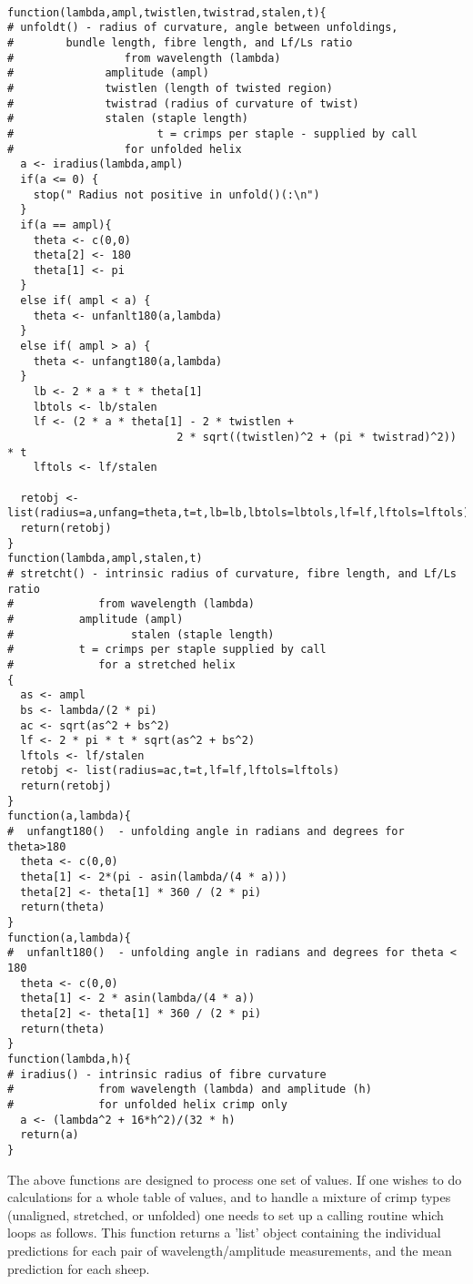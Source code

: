 \documentclass[titlepage,10pt]{article}  %
\begin{document}
\begin{verbatim}

function(lambda,ampl,twistlen,twistrad,stalen,t){
# unfoldt() - radius of curvature, angle between unfoldings,
#	     bundle length, fibre length, and Lf/Ls ratio
#                 from wavelength (lambda) 
#		       amplitude (ampl)
#		       twistlen (length of twisted region)
#		       twistrad (radius of curvature of twist)
#		       stalen (staple length)
#                      t = crimps per staple - supplied by call
#                 for unfolded helix
  a <- iradius(lambda,ampl)
  if(a <= 0) {
    stop(" Radius not positive in unfold()(:\n")
  }
  if(a == ampl){
    theta <- c(0,0)
    theta[2] <- 180
    theta[1] <- pi
  }
  else if( ampl < a) {
    theta <- unfanlt180(a,lambda)
  }
  else if( ampl > a) {
    theta <- unfangt180(a,lambda)
  }
    lb <- 2 * a * t * theta[1]
    lbtols <- lb/stalen
    lf <- (2 * a * theta[1] - 2 * twistlen +
                          2 * sqrt((twistlen)^2 + (pi * twistrad)^2)) * t
    lftols <- lf/stalen

  retobj <- list(radius=a,unfang=theta,t=t,lb=lb,lbtols=lbtols,lf=lf,lftols=lftols)
  return(retobj)
}
function(lambda,ampl,stalen,t)
# stretcht() - intrinsic radius of curvature, fibre length, and Lf/Ls ratio 
#             from wavelength (lambda) 
#		   amplitude (ampl)
#                  stalen (staple length)
#		   t = crimps per staple supplied by call
#             for a stretched helix
{
  as <- ampl
  bs <- lambda/(2 * pi)
  ac <- sqrt(as^2 + bs^2)
  lf <- 2 * pi * t * sqrt(as^2 + bs^2)
  lftols <- lf/stalen
  retobj <- list(radius=ac,t=t,lf=lf,lftols=lftols)
  return(retobj)
}
function(a,lambda){
#  unfangt180()  - unfolding angle in radians and degrees for theta>180
  theta <- c(0,0)
  theta[1] <- 2*(pi - asin(lambda/(4 * a)))
  theta[2] <- theta[1] * 360 / (2 * pi)
  return(theta)
}
function(a,lambda){
#  unfanlt180()  - unfolding angle in radians and degrees for theta < 180
  theta <- c(0,0)
  theta[1] <- 2 * asin(lambda/(4 * a))
  theta[2] <- theta[1] * 360 / (2 * pi)
  return(theta)
}
function(lambda,h){
# iradius() - intrinsic radius of fibre curvature
#             from wavelength (lambda) and amplitude (h)
#             for unfolded helix crimp only
  a <- (lambda^2 + 16*h^2)/(32 * h)
  return(a)
}
\end{verbatim}

The above functions are designed to process one set of values. If one wishes to do calculations for a whole table of values, and to handle a mixture of crimp types (unaligned, stretched, or unfolded) one needs to set up a calling routine which loops as follows. This function returns a 'list' object containing the individual predictions for each pair of wavelength/amplitude measurements, and the mean prediction for each sheep.
\end{document}
